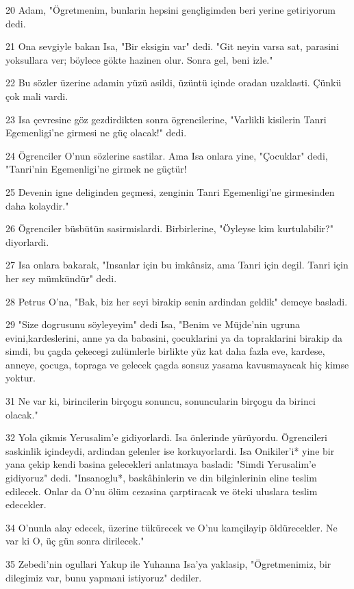 \par 20 Adam, "Ögretmenim, bunlarin hepsini gençligimden beri yerine getiriyorum dedi.
\par 21 Ona sevgiyle bakan Isa, "Bir eksigin var" dedi. "Git neyin varsa sat, parasini yoksullara ver; böylece gökte hazinen olur. Sonra gel, beni izle."
\par 22 Bu sözler üzerine adamin yüzü asildi, üzüntü içinde oradan uzaklasti. Çünkü çok mali vardi.
\par 23 Isa çevresine göz gezdirdikten sonra ögrencilerine, "Varlikli kisilerin Tanri Egemenligi'ne girmesi ne güç olacak!" dedi.
\par 24 Ögrenciler O'nun sözlerine sastilar. Ama Isa onlara yine, "Çocuklar" dedi, "Tanri'nin Egemenligi'ne girmek ne güçtür!
\par 25 Devenin igne deliginden geçmesi, zenginin Tanri Egemenligi'ne girmesinden daha kolaydir."
\par 26 Ögrenciler büsbütün sasirmislardi. Birbirlerine, "Öyleyse kim kurtulabilir?" diyorlardi.
\par 27 Isa onlara bakarak, "Insanlar için bu imkânsiz, ama Tanri için degil. Tanri için her sey mümkündür" dedi.
\par 28 Petrus O'na, "Bak, biz her seyi birakip senin ardindan geldik" demeye basladi.
\par 29 "Size dogrusunu söyleyeyim" dedi Isa, "Benim ve Müjde'nin ugruna evini,kardeslerini, anne ya da babasini, çocuklarini ya da topraklarini birakip da simdi, bu çagda çekecegi zulümlerle birlikte yüz kat daha fazla eve, kardese, anneye, çocuga, topraga ve gelecek çagda sonsuz yasama kavusmayacak hiç kimse yoktur.
\par 31 Ne var ki, birincilerin birçogu sonuncu, sonuncularin birçogu da birinci olacak."
\par 32 Yola çikmis Yerusalim'e gidiyorlardi. Isa önlerinde yürüyordu. Ögrencileri saskinlik içindeydi, ardindan gelenler ise korkuyorlardi. Isa Onikiler'i* yine bir yana çekip kendi basina gelecekleri anlatmaya basladi: "Simdi Yerusalim'e gidiyoruz" dedi. "Insanoglu*, baskâhinlerin ve din bilginlerinin eline teslim edilecek. Onlar da O'nu ölüm cezasina çarptiracak ve öteki uluslara teslim edecekler.
\par 34 O'nunla alay edecek, üzerine tükürecek ve O'nu kamçilayip öldürecekler. Ne var ki O, üç gün sonra dirilecek."
\par 35 Zebedi'nin ogullari Yakup ile Yuhanna Isa'ya yaklasip, "Ögretmenimiz, bir dilegimiz var, bunu yapmani istiyoruz" dediler.
